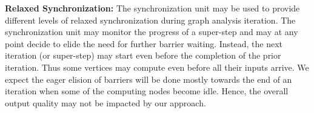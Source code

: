 \noindent
\textbf{Relaxed Synchronization:} 
The synchronization unit may be used to provide different levels of relaxed synchronization during graph analysis iteration. 
The synchronization unit may monitor the progress of a super-step and may at any point decide to elide the need for further barrier waiting. 
Instead, the next iteration (or super-step) may start even before the completion of the prior iteration. 
Thus some vertices may compute even before all their inputs arrive. 
We expect the eager elision of barriers will be done mostly towards the end of an iteration when some of the computing nodes become idle. 
Hence, the overall output quality may not be impacted by our approach. 
